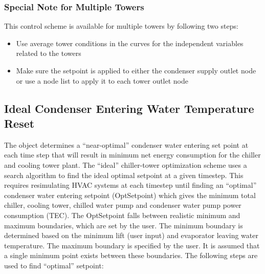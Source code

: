 \subsubsection{Special Note for Multiple Towers}\label{special-note-for-multiple-towers}

This control scheme is available for multiple towers by following two steps:

\begin{itemize}
\tightlist
\item
  Use average tower conditions in the curves for the independent variables related to the towers
\item
  Make sure the setpoint is applied to either the condenser supply outlet node or use a node list to apply it to each tower outlet node
\end{itemize}

\subsection{Ideal Condenser Entering Water Temperature Reset}\label{ideal-condenser-entering-water-temperature-reset}

The object determines a ``near-optimal'' condenser water entering set point at each time step that will result in minimum net energy consumption for the chiller and cooling tower plant. The ``ideal'' chiller-tower optimization scheme uses a search algorithm to find the ideal optimal setpoint at a given timestep. This requires resimulating HVAC systems at each timestep until finding an ``optimal'' condenser water entering setpoint (OptSetpoint) which gives the minimum total chiller, cooling tower, chilled water pump and condenser water pump power consumption (TEC). The OptSetpoint falls between realistic minimum and maximum boundaries, which are set by the user. The minimum boundary is determined based on the minimum lift (user input) and evaporator leaving water temperature. The maximum boundary is specified by the user. It is assumed that a single minimum point exists between these boundaries. The following steps are used to find ``optimal'' setpoint:

